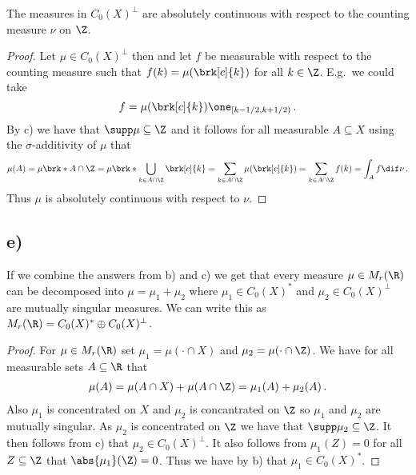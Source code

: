 \begin{claim}
The measures in $C_0(X)^\perp$ are absolutely continuous with respect to the counting measure $\nu$ on $\Z$.
\end{claim}
\begin{proof}
Let $\mu\in C_0(X)^\perp$ then and let $f$ be measurable with respect to the counting measure such that $f(k)=\mu(\brk[c]{k})$ for all $k\in\Z$. E.g.\ we could take 
$$f=\mu(\brk[c]{k})\one_{[k-1/2,k+1/2)}\,.$$
By c) we have that $\supp \mu\subseteq\Z$ and it follows for all measurable $A\subseteq X$ using the $\sigma$-additivity of $\mu$ that
\begin{align*}
	\mu(A)=\mu\brk*{A\cap \Z}
	=\mu\brk*{\bigcup_{k\in A\cap \Z}\brk[c]{k}}
	=\sum_{k\in A\cap \Z}\mu(\brk[c]{k})
	=\sum_{k\in A\cap \Z}f(k)
	=\int_Af\dif \nu\,.
\end{align*}
Thus $\mu$ is absolutely continuous with respect to $\nu$.
\end{proof}

\subsection{e)}
\begin{claim}
If we combine the answers from b) and c) we get that every measure $\mu\in M_r(\R)$ can be decomposed into $\mu=\mu_1+\mu_2$ where $\mu_1\in C_0(X)^*$ and $\mu_2\in C_0(X)^\perp$ are mutually singular measures. We can write this as $M_r(\R)=C_0(X)^*\oplus C_0(X)^\perp$.
\end{claim}
\begin{proof}
For $\mu\in M_r(\R)$ set $\mu_1=\mu(\cdot\cap X)$ and $\mu_2=\mu(\cdot\cap \Z)$. We have for all measurable sets $A\subseteq\R$ that
\begin{align*}
	\mu(A) = \mu(A\cap X)+\mu(A\cap \Z)=\mu_1(A)+\mu_2(A)\,.
\end{align*}
Also $\mu_1$ is concentrated on $X$ and $\mu_2$ is concantrated on $\Z$ so $\mu_1$ and $\mu_2$ are mutually singular. As $\mu_2$ is concentrated on $\Z$ we have that $\supp\mu_2\subseteq\Z$. It then follows from c) that $\mu_2\in C_0(X)^\perp$. It also follows from $\mu_1(Z)=0$ for all $Z\subseteq \Z$ that $\abs{\mu_1}(\Z)=0$. Thus we have by b) that $\mu_1\in C_0(X)^*$.
\end{proof}



\nocite{*}
\printbibliography


